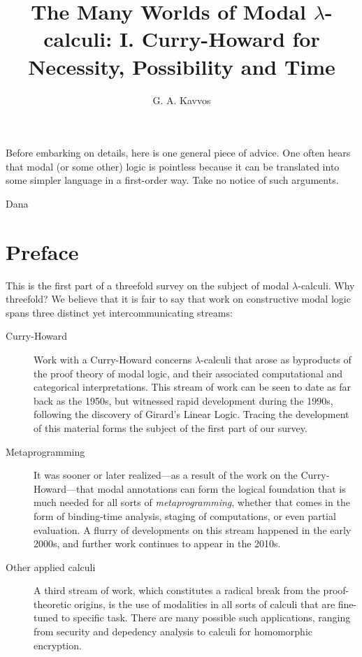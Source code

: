 \documentclass[a4paper]{amsart}
\title[The Many Worlds of Modal $\lambda$-calculi: Part I]
{The Many Worlds of Modal $\lambda$-calculi: I. Curry-Howard for
Necessity, Possibility and Time}
\author{G. A. Kavvos}
\begin{document}
\maketitle

\tableofcontents

\textwidth
\epigraph{Before embarking on details, here is one general piece
of advice. One often hears that modal (or some other) logic is
pointless because it can be translated into some simpler language
in a first-order way. Take no notice of such
arguments.}{Dana \cite{Scott1970}}

\pagebreak

\section*{Preface}

This is the first part of a threefold survey on the
subject of modal $\lambda$-calculi. Why threefold? We believe that
it is fair to say that work on constructive modal logic spans
three distinct yet intercommunicating streams:

\begin{description} \item[Curry-Howard] Work with a Curry-Howard
  concerns $\lambda$-calculi that arose as byproducts of the proof
  theory of modal logic, and their associated computational and
  categorical interpretations. This stream of work can be seen to
  date as far back as the 1950s, but witnessed rapid development
  during the 1990s, following the discovery of Girard's Linear
  Logic. Tracing the development of this material forms the
  subject of the first part of our survey.

  \item[Metaprogramming] It was sooner or later realized---as a
  result of the work on the Curry-Howard---that modal annotations
  can form the logical foundation that is much needed for all
  sorts of \emph{metaprogramming}, whether that comes in the form
  of binding-time analysis, staging of computations, or even
  partial evaluation. A flurry of developments on this stream
  happened in the early 2000s, and further work continues to
  appear in the 2010s.

  \item[Other applied calculi] A third stream of work, which
  constitutes a radical break from the proof-theoretic origins, is
  the use of modalities in all sorts of calculi that are
  fine-tuned to specific task. There are many possible such
  applications, ranging from security and depedency analysis to
  calculi for homomorphic encryption.
\end{description}
\end{document}
